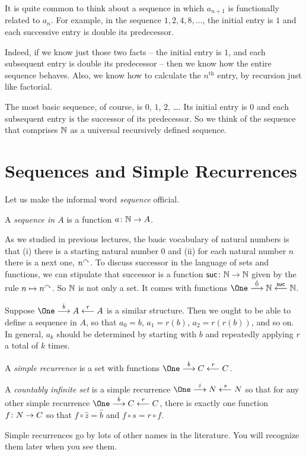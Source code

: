 It is quite common to think about a sequence in which $a_{n+1}$ is functionally related to $a_n$. 
For example, in the sequence $1, 2, 4, 8,\ldots$, the initial entry is $1$ and each successive entry is double its predecessor.

Indeed, if we know just those two facts -- the initial entry is $1$, and each subsequent entry is double its predecessor -- then we know how the entire sequence behaves.
Also, we know how to calculate the $n^{\text{th}}$ entry, by recursion just like factorial.

The most basic sequence, of course, is $0$, $1$, $2$, \ldots. 
Its initial entry is $0$ and each subsequent entry is the successor of its predecessor. 
So we think of the sequence that comprises $\mathbb N$ as a universal recursively defined sequence.

\section{Sequences and Simple Recurrences}

Let us make the informal word \emph{sequence} official.

\begin{defn}
	A \emph{sequence in $A$} is a function ${a}\colon{\mathbb N}\to{A}$.
\end{defn}

As we studied in previous lectures, the basic vocabulary of natural numbers is that (i) there is a starting natural number $0$ and (ii) for each natural number $n$ there is a next one, $n^\curvearrowright$. 
To discuss successor in the language of sets and functions, we can stipulate that successor is a function ${\mathord{\textsf{suc}}}\colon{\mathbb N}\to{\mathbb N}$ given by the rule $n\mapsto n^\curvearrowright$.
So $\mathbb N$ is not only a set. 
It comes with functions $\One \stackrel{\hat{0}}{\longrightarrow} \NN \stackrel{\suc}{\longleftarrow} \NN$.

Suppose $\One\stackrel{\hat{b}}{\longrightarrow}A\stackrel{r}{\longleftarrow}A$ is a similar structure.
Then we ought to be able to define a sequence in $A$, so that $a_0=b$, $a_1=r(b)$, $a_2=r(r(b))$, and so on. 
In general, $a_k$ should be determined by starting with $b$ and repeatedly applying $r$ a total of $k$ times. 

\begin{defn}\label{def:nno}
	A \emph{simple recurrence} is a set with functions $\One\stackrel{\hat{b}}{\longrightarrow}C\stackrel{r}{\longleftarrow}C$.
	
	A \emph{countably infinite set} is a simple recurrence $\One\stackrel{\hat{z}}{\longrightarrow}N\stackrel{s}{\longleftarrow}N$ so that for any other simple recurrence $\One\stackrel{\hat{b}}{\longrightarrow}C\stackrel{r}{\longleftarrow}C$, there is exactly one function ${f}\colon{N}\to{C}$ so that $f\circ \hat{z} =\hat b$ and $f\circ s = r\circ f$.
	
	Simple recurrences go by lots of other names in the literature. You will recognize them later when you see them.
\end{defn}

